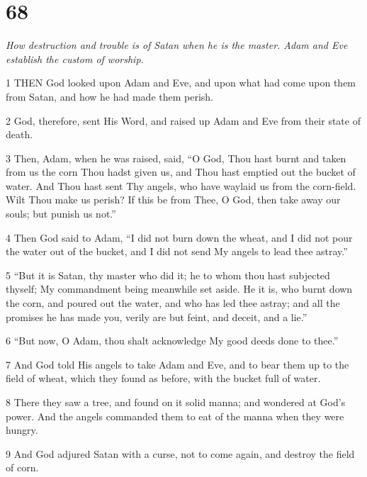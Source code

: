 \chapter{68}

\par \textit{How destruction and trouble is of Satan when he is the master. Adam and Eve establish the custom of worship.}

\par 1 THEN God looked upon Adam and Eve, and upon what had come upon them from Satan, and how he had made them perish.

\par 2 God, therefore, sent His Word, and raised up Adam and Eve from their state of death.

\par 3 Then, Adam, when he was raised, said, “O God, Thou hast burnt and taken from us the corn Thou hadst given us, and Thou hast emptied out the bucket of water. And Thou hast sent Thy angels, who have waylaid us from the corn-field. Wilt Thou make us perish? If this be from Thee, O God, then take away our souls; but punish us not.”

\par 4 Then God said to Adam, “I did not burn down the wheat, and I did not pour the water out of the bucket, and I did not send My angels to lead thee astray.”

\par 5 “But it is Satan, thy master who did it; he to whom thou hast subjected thyself; My commandment being meanwhile set aside. He it is, who burnt down the corn, and poured out the water, and who has led thee astray; and all the promises he has made you, verily are but feint, and deceit, and a lie.”

\par 6 “But now, O Adam, thou shalt acknowledge My good deeds done to thee.”

\par 7 And God told His angels to take Adam and Eve, and to bear them up to the field of wheat, which they found as before, with the bucket full of water.

\par 8 There they saw a tree, and found on it solid manna; and wondered at God's power. And the angels commanded them to eat of the manna when they were hungry.

\par 9 And God adjured Satan with a curse, not to come again, and destroy the field of corn.

